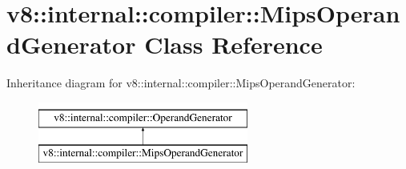 \hypertarget{classv8_1_1internal_1_1compiler_1_1MipsOperandGenerator}{}\section{v8\+:\+:internal\+:\+:compiler\+:\+:Mips\+Operand\+Generator Class Reference}
\label{classv8_1_1internal_1_1compiler_1_1MipsOperandGenerator}
Inheritance diagram for v8\+:\+:internal\+:\+:compiler\+:\+:Mips\+Operand\+Generator\+:\begin{figure}[H]
\begin{center}
\leavevmode
\includegraphics[height=2.000000cm]{classv8_1_1internal_1_1compiler_1_1MipsOperandGenerator}
\end{center}
\end{figure}
